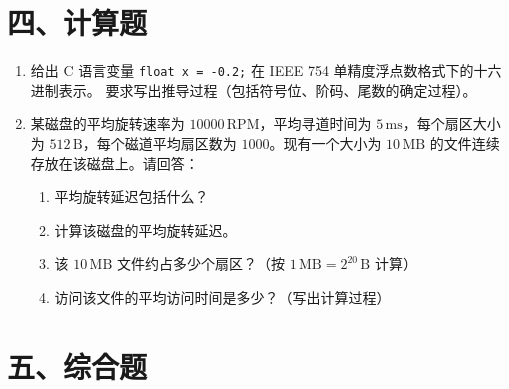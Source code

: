 \documentclass[11pt,a4paper]{ctexart}
\begin{document}
\section*{四、计算题}

\begin{enumerate}[resume]
\item 给出 C 语言变量 \texttt{float x = -0.2;} 在 IEEE 754 单精度浮点数格式下的十六进制表示。
要求写出推导过程（包括符号位、阶码、尾数的确定过程）。

\vspace{5em}

\item 某磁盘的平均旋转速率为 $10000\,\mathrm{RPM}$，平均寻道时间为 $5\,\mathrm{ms}$，每个扇区大小为 $512\,\mathrm{B}$，每个磁道平均扇区数为 $1000$。现有一个大小为 $10\,\mathrm{MB}$ 的文件连续存放在该磁盘上。请回答：
\begin{enumerate}
  \item 平均旋转延迟包括什么？
  \item 计算该磁盘的平均旋转延迟。
  \item 该 $10\,\mathrm{MB}$ 文件约占多少个扇区？（按 $1\,\mathrm{MB}=2^{20}\,\mathrm{B}$ 计算）
  \item 访问该文件的平均访问时间是多少？（写出计算过程）
\end{enumerate}

\vspace{4em}
\end{enumerate}

\section*{五、综合题}
\end{document}
